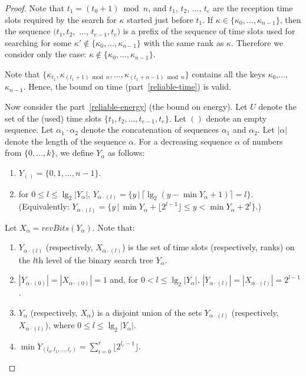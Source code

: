 \documentclass{llncs}
\begin{document}
\begin{proof}

Note that $t_1= (t_0+1)\bmod n$,
and $t_1$, $t_2$, $\ldots$, $t_e$ are the reception time slots 
required by the search for $\kappa$ 
started just before $t_1$. 
If $\kappa\in \{\kappa_0,\ldots,\kappa_{n-1}\}$,
then the sequence $(t_1,t_2,$ $\ldots$, $t_{e-1},t_e)$ is
a prefix of the sequence of time slots used for 
searching for some $\kappa'\not\in \{\kappa_0,\ldots,\kappa_{n-1}\}$
with the same rank as $\kappa$.
Therefore we consider only the case: $\kappa\not\in \{\kappa_0,\ldots,\kappa_{n-1}\}$.

Note that $\{ \kappa_{t_1}, \kappa_{(t_1+1)\bmod n},\ldots, \kappa_{(t_1+n-1)\bmod n}\}$
contains all the keys $\kappa_0$,$\ldots$,$\kappa_{n-1}$.
Hence, the bound on time (part~\ref{reliable-time}) is valid.

Now consider the part~\ref{reliable-energy} (the bound on energy).
Let $U$ denote the set of the (used) time slots $\{t_1,t_2,\ldots,t_{e-1},t_e\}$.
Let $()$ denote an empty sequence.
Let $\alpha_1\cdot\alpha_2$ denote the 
concatenation of sequences $\alpha_1$ and $\alpha_2$.
Let $|\alpha|$ denote the length of the sequence $\alpha$.
For a decreasing sequence $\alpha$ of numbers from $\{0,\ldots,k\}$, 
we define $Y_\alpha$ as follows:
\begin{enumerate}
\item
  $Y_{()}=\{0,1,\ldots, n-1 \}$.

\item for $0\le l\le \lg_2 |Y_\alpha|$,
  $Y_{\alpha\cdot (l)}=\{ y\,|\, \lceil \lg_2(y-\min Y_\alpha+1)\rceil = l \}$.
  (Equivalently: 
   $Y_{\alpha\cdot (l)}=\{ y\,|\, \min Y_{\alpha}+\lfloor 2^{l-1}\rfloor \le y< \min Y_{\alpha}+2^l \}$.)
\end{enumerate}

Let $X_\alpha=revBits(Y_\alpha)$.
Note that:
\begin{lemma}\label{basic-lemma}
\begin{enumerate}
\item
  $Y_{\alpha\cdot (l)}$ (respectively, $X_{\alpha\cdot (l)}$)
  is the set of time slots (respectively, ranks) on the $l$th level of the binary search tree $Y_\alpha$.
\item
  $|Y_{\alpha\cdot(0)}|=|X_{\alpha\cdot(0)}|=1$ and,
  for $0<l\le \lg_2 |Y_\alpha| $, $|Y_{\alpha\cdot(l)}|=|X_{\alpha\cdot(l)}|=2^{l-1}$.
\item
  $Y_\alpha$ (respectively, $X_\alpha$) is
  a disjoint union of the sets $Y_{\alpha\cdot (l)}$ (respectively, $X_{\alpha\cdot (l)}$),
  where $0\le l\le \lg_2 |Y_\alpha|$. %
\item\label{basic-minimum}
  $\min Y_{(l_0,l_1,\ldots,l_r)}=\sum_{i=0}^r \lfloor 2^{l_r-1}\rfloor$.
\end{enumerate}
\end{lemma}


\end{proof}
\end{document}
